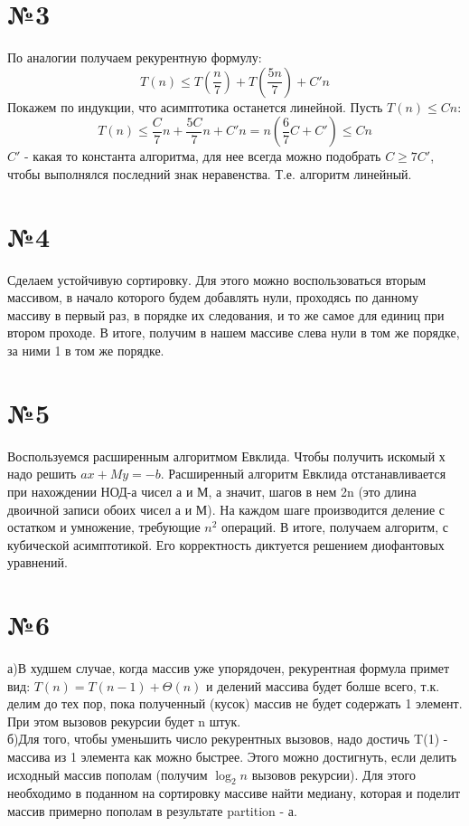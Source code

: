 \documentclass[a4paper,12pt]{article} %
\begin{document}
 \section*{№3}
 По аналогии получаем рекурентную формулу:
  \[
T(n)\leqslant T(\dfrac{n}{7})+T(\dfrac{5n}{7})+C'n  
  \]
  Покажем по индукции, что асимптотика останется линейной. Пусть $T(n)\leqslant Cn$:
  \[
T(n)\leqslant \dfrac{C}{7} n + \dfrac{5C}{7} n + C' n = n(\dfrac{6}{7}C+C')  \leqslant Cn
  \]
$ C'$ - какая то константа алгоритма, для нее всегда можно подобрать $C\geqslant 7C'$, чтобы выполнялся последний знак неравенства. Т.е. алгоритм линейный.\\
   \section*{№4}
   Сделаем устойчивую сортировку. Для этого можно воспользоваться вторым массивом, в начало которого будем добавлять нули, проходясь по данному массиву в первый раз, в порядке их следования, и то же самое для единиц при втором проходе. В итоге, получим в нашем массиве слева нули в том же порядке, за ними 1 в том же порядке. \\
   \section*{№5}
    Воспользуемся расширенным алгоритмом Евклида. Чтобы получить искомый х надо решить $ax+My=-b$.  Расширенный алгоритм Евклида отстанавливается при нахождении НОД-а чисел а и М, а значит, шагов в нем 2n (это длина двоичной записи обоих чисел а и М). На каждом шаге производится деление с остатком и умножение, требующие $n^{2}$ операций. В итоге, получаем алгоритм, с кубической асимптотикой. Его корректность диктуется решением диофантовых уравнений.\\
       \section*{№6}
      а)В худшем случае, когда массив уже упорядочен, рекурентная формула примет вид:
     $T(n)=T(n-1)+\Theta(n)$ и делений массива будет болше всего, т.к. делим до тех пор, пока полученный (кусок) массив не будет содержать 1 элемент. При этом
вызовов рекурсии будет n штук.\\
б)Для того, чтобы уменьшить число рекурентных вызовов, надо достичь T(1) - массива из 1 элемента как можно быстрее. Этого можно достигнуть, если
делить исходный массив пополам (получим $\log_{2}{n}$ вызовов рекурсии). Для этого необходимо в поданном на сортировку массиве найти медиану, которая и поделит массив примерно пополам в результате partition - а.\\
\end{document}
